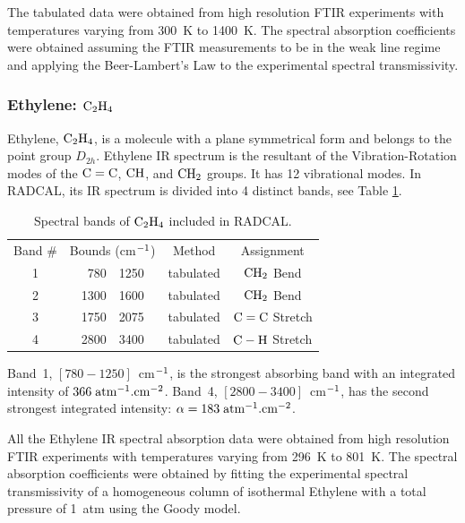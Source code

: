   The tabulated data were obtained from high resolution
  FTIR experiments with temperatures varying from 300~K to 1400~K.
  The spectral absorption coefficients were obtained 
  assuming the FTIR measurements to be in the weak line
  regime and applying the Beer-Lambert's Law to 
  the experimental spectral transmissivity. 

\subsubsection{Ethylene: $\rm C_2H_4$}

  Ethylene, $\rm C_2H_4$, is a molecule with a plane symmetrical form
  and belongs to the point group $D_{2h}$. Ethylene IR spectrum
  is the resultant of the Vibration-Rotation modes of
  the $\rm C=C$, $\rm CH$, and $\rm CH_2$ groups.
  It has 12 vibrational modes. In RADCAL, its IR spectrum is divided
  into 4 distinct bands, see Table \ref{Table::C2H4}.
  \begin{table}[h p] 
    \centering
    \caption{Spectral bands of $\rm C_2H_4$ included in RADCAL.}
    \vspace{0.1in}
    \label{Table::C2H4}
    \begin{tabular}{|c|r@{-}l|c|c|} 
      \hline
      Band \# & \multicolumn{2}{|l|}{Bounds (cm$\rm ^{-1}$) } & Method & Assignment \\
      \cline{1-5}  
      1 & 780  & 1250 & tabulated &  $\rm CH_2$ Bend\\
      2 & 1300 & 1600 & tabulated &  $\rm CH_2$ Bend\\
      3 & 1750 & 2075 & tabulated &  $\rm C=C$  Stretch \\
      4 & 2800 & 3400 & tabulated &  $\rm C-H$  Stretch \\
      \hline
    \end{tabular} 
  \end{table}
  Band~1, $\left[780-1250\right]$~cm$\rm ^{-1}$, is the strongest absorbing band with
  an integrated intensity of $366\;\rm {atm^{-1}.cm^{-2}}$.
  Band~4, $\left[2800-3400\right]$~cm$\rm ^{-1}$, has the second strongest 
  integrated intensity: $\alpha = 183\;\rm {atm^{-1}.cm^{-2}}$.
  
  All the Ethylene IR spectral absorption data were obtained from high resolution
  FTIR experiments with temperatures varying from 296~K to 801~K.
  The spectral absorption coefficients were obtained by fitting the experimental
  spectral transmissivity of a homogeneous column of isothermal Ethylene
  with a total pressure of 1~atm using the Goody model. 

